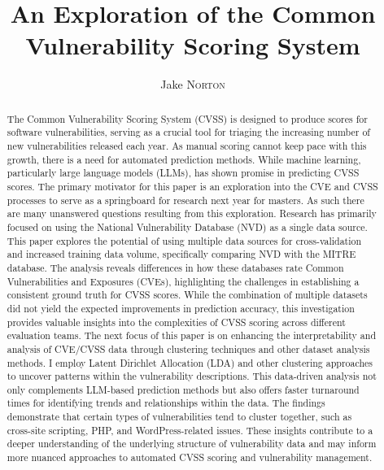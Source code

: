 \documentclass[12pt]{article}
\title{An Exploration of the Common Vulnerability Scoring System}
\author{Jake \textsc{Norton}}
\begin{document}
\maketitle

\begin{abstract}

	The Common Vulnerability Scoring System (CVSS) is designed to produce scores for software
	vulnerabilities, serving as a crucial tool for triaging the increasing number of new
	vulnerabilities released each year. As manual scoring cannot keep pace with this growth, there
	is a need for automated prediction methods. While machine learning, particularly large language
	models (LLMs), has shown promise in predicting CVSS scores. The primary motivator for this paper
	is an exploration into the CVE and CVSS processes to serve as a springboard for research next
	year for masters. As such there are many unanswered questions resulting from this exploration.
	Research has primarily focused on using the National Vulnerability Database (NVD) as a single
	data source. This paper explores the potential of using multiple data sources for
	cross-validation and increased training data volume, specifically comparing NVD with the MITRE
	database. The analysis reveals differences in how these databases rate Common Vulnerabilities
	and Exposures (CVEs), highlighting the challenges in establishing a consistent ground truth for
	CVSS scores. While the combination of multiple datasets did not yield the expected improvements
	in prediction accuracy, this investigation provides valuable insights into the complexities of
	CVSS scoring across different evaluation teams. The next focus of this paper is on enhancing the
	interpretability and analysis of CVE/CVSS data through clustering techniques and other dataset
	analysis methods. I employ Latent Dirichlet Allocation (LDA) and other clustering approaches to
	uncover patterns within the vulnerability descriptions. This data-driven analysis not only
	complements LLM-based prediction methods but also offers faster turnaround times for identifying
	trends and relationships within the data. The findings demonstrate that certain types of
	vulnerabilities tend to cluster together, such as cross-site scripting, PHP, and
	WordPress-related issues. These insights contribute to a deeper understanding of the underlying
	structure of vulnerability data and may inform more nuanced approaches to automated CVSS scoring
	and vulnerability management.

\end{abstract}
\end{document}
